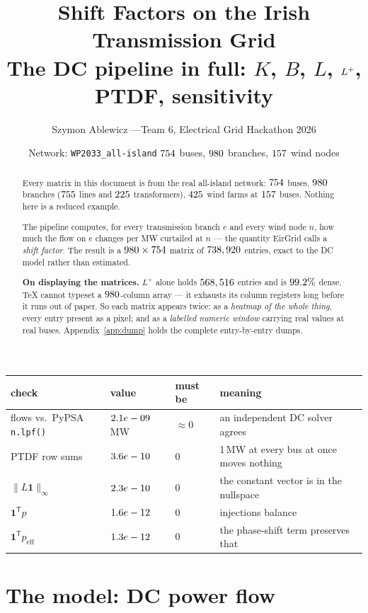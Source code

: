 \documentclass[11pt,a4paper]{article}
\title{\textbf{Shift Factors on the Irish Transmission Grid}\\[2mm]
\large The DC pipeline in full: $K$, $B$, $L$, $\Lp$, PTDF, sensitivity}
\author{Szymon Ablewicz \quad---\quad Team 6, Electrical Grid Hackathon 2026}
\date{Network: \texttt{WP2033\_all-island} \quad
      $754$ buses, $980$ branches, $157$ wind nodes}
\newcommand{\T}{^{\mathsf{T}}}
\newcommand{\Lp}{L^{+}}
\begin{document}
\maketitle

\begin{abstract}
\noindent
Every matrix in this document is from the real all-island network:
$754$ buses, $980$ branches ($755$ lines and $225$ transformers),
$425$ wind farms at $157$ buses. Nothing here is a reduced example.

The pipeline computes, for every transmission branch $e$ and every wind node
$n$, how much the flow on $e$ changes per MW curtailed at $n$ --- the quantity
EirGrid calls a \emph{shift factor}. The result is a
$980 \times 754$ matrix of $738,920$ entries, exact to the DC model
rather than estimated.

\medskip\noindent
\textbf{On displaying the matrices.} $\Lp$ alone holds $568,516$ entries
and is $99.2\%$ dense. \TeX{} cannot typeset a $980$-column array --- it
exhausts its column registers long before it runs out of paper. So each matrix
appears twice: as a \emph{heatmap of the whole thing}, every entry present as
a pixel; and as a \emph{labelled numeric window} carrying real values at real
buses. Appendix~\ref{app:dump} holds the complete entry-by-entry dumps.
\end{abstract}

\vspace{2mm}
\begin{center}\small
\begin{tabular}{llll}
\toprule
\textbf{check} & \textbf{value} & \textbf{must be} & \textbf{meaning}\\
\midrule
flows vs.\ PyPSA \texttt{n.lpf()} & $2.1e-09$ MW & $\approx 0$ & an independent DC solver agrees\\
PTDF row sums & $3.6e-10$ & $0$ & 1\,MW at every bus at once moves nothing\\
$\|L\mathbf{1}\|_\infty$ & $2.3e-10$ & $0$ & the constant vector is in the nullspace\\
$\mathbf{1}\T p$ & $1.6e-12$ & $0$ & injections balance\\
$\mathbf{1}\T p_{\text{eff}}$ & $1.3e-12$ & $0$ & the phase-shift term preserves that\\
\bottomrule
\end{tabular}
\end{center}

\newpage
\section{The model: DC power flow}
\end{document}
